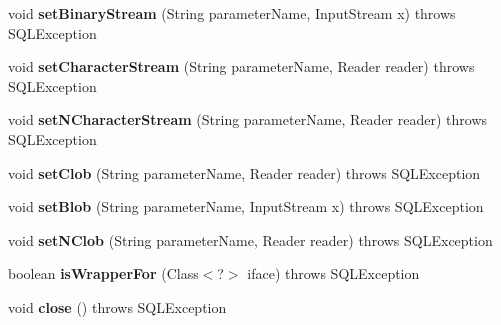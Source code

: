 \begin{DoxyCompactItemize}
void {\bfseries set\+Binary\+Stream} (String parameter\+Name, Input\+Stream x)  throws S\+Q\+L\+Exception 
\item 
\mbox{\label{classcom_1_1mysql_1_1cj_1_1jdbc_1_1_callable_statement_wrapper_a893fb5d17115cba6a90a16b9191a72e7}} 
void {\bfseries set\+Character\+Stream} (String parameter\+Name, Reader reader)  throws S\+Q\+L\+Exception 
\item 
\mbox{\label{classcom_1_1mysql_1_1cj_1_1jdbc_1_1_callable_statement_wrapper_a6c84ab6864480e3be64630516cf06d37}} 
void {\bfseries set\+N\+Character\+Stream} (String parameter\+Name, Reader reader)  throws S\+Q\+L\+Exception 
\item 
\mbox{\label{classcom_1_1mysql_1_1cj_1_1jdbc_1_1_callable_statement_wrapper_a1538788a23a7c20ad0e677ff9aefd6fa}} 
void {\bfseries set\+Clob} (String parameter\+Name, Reader reader)  throws S\+Q\+L\+Exception 
\item 
\mbox{\label{classcom_1_1mysql_1_1cj_1_1jdbc_1_1_callable_statement_wrapper_af2ea894427fc22d18316aa88356946cc}} 
void {\bfseries set\+Blob} (String parameter\+Name, Input\+Stream x)  throws S\+Q\+L\+Exception 
\item 
\mbox{\label{classcom_1_1mysql_1_1cj_1_1jdbc_1_1_callable_statement_wrapper_aab6be9977f1f392d2773a3b36bccccbe}} 
void {\bfseries set\+N\+Clob} (String parameter\+Name, Reader reader)  throws S\+Q\+L\+Exception 
\item 
\mbox{\label{classcom_1_1mysql_1_1cj_1_1jdbc_1_1_callable_statement_wrapper_ad588d39d1deeda920f425e77bc3d167a}} 
boolean {\bfseries is\+Wrapper\+For} (Class$<$?$>$ iface)  throws S\+Q\+L\+Exception 
\item 
\mbox{\label{classcom_1_1mysql_1_1cj_1_1jdbc_1_1_callable_statement_wrapper_a2afbb0b1bef5811e72e7b4f2bb4b3263}} 
void {\bfseries close} ()  throws S\+Q\+L\+Exception 

\end{DoxyCompactItemize}
